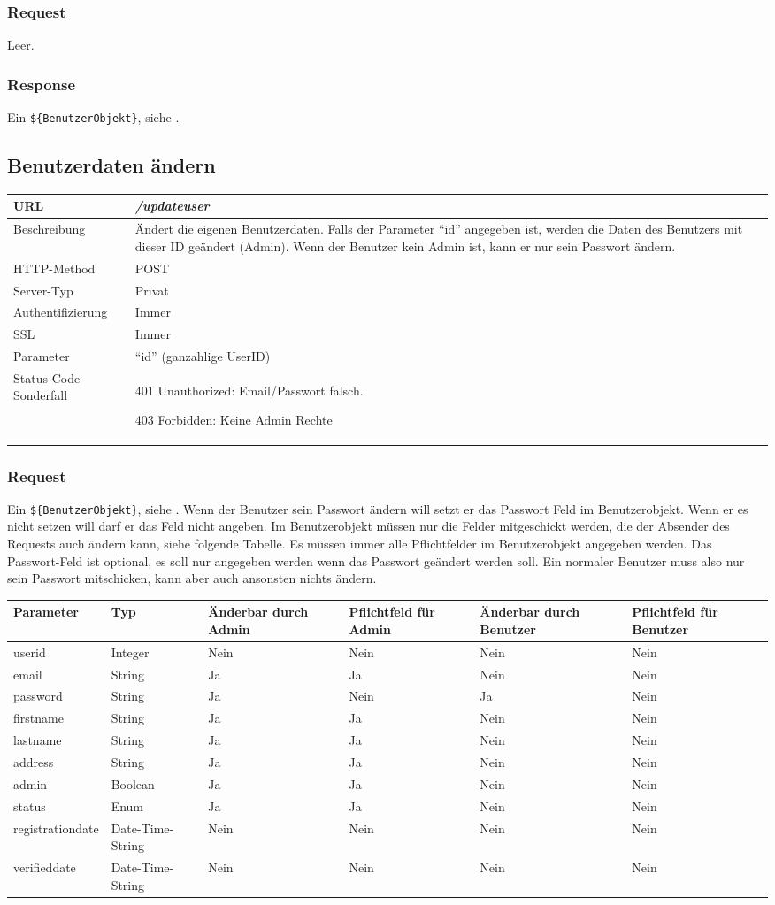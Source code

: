 \documentclass[ngerman,titlepage,parskip=true]{scrartcl}
\newcommand{\requestURL}[1]{\textit{#1}}
\newcommand{\request}[9]
{\subsection{#1}
\begin{tabular}{|p{0.2\textwidth}|p{0.7\textwidth}|}
\hline
  URL & \requestURL{#2}\\\hline
    Beschreibung & #3\\\hline
  HTTP-Method & #4\\\hline
  Server-Typ & #5\\\hline
  Authentifizierung & #6\\\hline
  SSL & #7\\\hline
  Parameter & #8\\\hline
  Status-Code Sonderfall & #9\\\hline
 \end{tabular}\vspace*{1em}}
{}%
{}%
{}%
{}%
{}%
{}%
{}%
{}%
\begin{document}
\subsubsection{Request}
Leer.
\subsubsection{Response}
Ein \texttt{\$\{BenutzerObjekt\}}, siehe .
\clearpage


\request{Benutzerdaten ändern}%
{/updateuser}%
{Ändert die eigenen Benutzerdaten. Falls der Parameter ``id'' angegeben ist, werden die Daten des Benutzers mit dieser ID geändert (Admin). Wenn der Benutzer kein Admin ist, kann er nur sein Passwort ändern.}%
{POST}%
{Privat}%
{Immer}%
{Immer}%
{``id'' (ganzahlige UserID)}%
{401 Unauthorized: Email/Passwort falsch.\par
 403 Forbidden: Keine Admin Rechte}%
\subsubsection{Request}
Ein \texttt{\$\{BenutzerObjekt\}}, siehe .
Wenn der Benutzer sein Passwort ändern will setzt er das Passwort Feld im Benutzerobjekt. Wenn er es nicht setzen will darf er das Feld nicht angeben. Im Benutzerobjekt müssen nur die Felder mitgeschickt werden, die der Absender des Requests auch ändern kann, siehe folgende Tabelle. Es müssen immer alle Pflichtfelder im Benutzerobjekt angegeben werden. Das Passwort-Feld ist optional, es soll nur angegeben werden wenn das Passwort geändert werden soll. Ein normaler Benutzer muss also nur sein Passwort mitschicken, kann aber auch ansonsten nichts ändern. 

	\begin{tabular}{|p{}|p{}|p{}|p{}|p{}|p{}|}
	\hline
	Parameter 			& Typ 		& Änderbar durch Admin & Pflichtfeld für Admin & Änderbar durch Benutzer & Pflichtfeld für Benutzer \\\hline
	userid 				& Integer 			& Nein & Nein 	& Nein & Nein\\
	email 				& String 			& Ja   & Ja 	& Nein & Nein\\
	password 			& String 			& Ja   & Nein 	& Ja   & Nein\\
	firstname 			& String 			& Ja   & Ja 	& Nein & Nein\\
	lastname 			& String 			& Ja   & Ja 	& Nein & Nein\\
	address 			& String 			& Ja   & Ja 	& Nein & Nein\\
	admin 				& Boolean 			& Ja   & Ja 	& Nein & Nein\\
	status 				& Enum	 			& Ja   & Ja 	& Nein & Nein\\
	registrationdate 	& Date-Time-String 	& Nein & Nein 	& Nein & Nein\\
	verifieddate 		& Date-Time-String 	& Nein & Nein	& Nein & Nein\\
	\hline
	\end{tabular}
\end{document}
